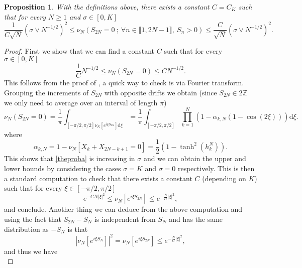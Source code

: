 \documentclass[reqno,11pt]{amsart}
\numberwithin{equation}{section}
\newcommand{\bbZ}{{\ensuremath{\mathbb Z}} }
\newcommand{\lint}{\llbracket}
\newcommand{\rint}{\rrbracket}
\newtheorem{proposition}[theorem]{Proposition}
\newcommand{\dd}{\mathrm{d}}
\begin{document}
\begin{proposition}\label{th:lemnun}
 With the definitions above, there exists a constant $C=C_K$ such that for every $N\ge 1$ and $\sigma\in[0,K]$
 \begin{equation}\label{compar}
 \frac{1}{C\sqrt{N}}(\sigma\vee N^{-1/2})^2 \le \nu_{N}\left( S_{2N}=0 \ ; \ \forall n\in \lint 1,2N-1\rint, \ S_{n}>0  \right)\le \frac{C}{\sqrt{N}}(\sigma\vee N^{-1/2})^2 .
 \end{equation}

\end{proposition}



\begin{proof}
 First we show that we can find a constant $C$ such that for every $\sigma\in[0,K]$
 \begin{equation}\label{zigma}
 \frac{1}{C} N^{-1/2} \le \nu_N(S_{2N}=0)\le C N^{-1/2}.
 \end{equation}
 This follows from  the proof of \cite[Lemma 11]{LabbeWABridge}, a quick way to check is via Fourier transform.
Grouping the increments of $S_{2N}$ with opposite drifts we obtain (since $S_{2N}\in 2\bbZ$ we only need to average over an interval of length $\pi$)
 \begin{equation}\label{theproba}
  \nu_N(S_{2N}=0)=  \frac{1}{\pi}\int_{[-\pi/2,\pi/2] \nu_N[e^{i\xi S_{2N}}]\dd \xi }
  =  \frac{1}{\pi} \int_{[-\pi/2,\pi/2]} \prod_{k=1}^{N} \left(1-\alpha_{k,N}(1-\cos (2\xi))    \right) \dd \xi.
 \end{equation}
where  $$\alpha_{k,N}=1-\nu_N[X_k+X_{2N-k+1}=0]=\frac{1}{2}\left(1-  \tanh^2 (h^N_k)\right)
.$$
This shows that \eqref{theproba} is increasing in $\sigma$ and we can obtain the upper and lower bounds by considering the cases $\sigma=K$ and $\sigma=0$ respectively. This is then a standard computation  to check that there exists a constant $C$ (depending on $K$) such that for every $\xi \in [-\pi/2,\pi/2]$
\begin{equation}
  e^{- CN|\xi|^2 }\le   \nu_N [e^{i\xi S_{2N}}] \le  e^{- \frac{N}{C}|\xi|^2 },
\end{equation}
and conclude.
Another thing we can deduce from the above computation 
and using the fact that $S_{2N}-S_N$ is independent from $S_N$ and has the same distribution as $-S_N$ is that 
\begin{equation}
 | { \nu_N}[e^{i\xi S_{N}}]|^2= \nu_N[e^{i\xi S_{2N}}] \le  e^{- \frac{N}{C}|\xi|^2 },
\end{equation}
and thus we have 
\begin{equation}\label{unifbound}

\end{equation}
\end{proof}
\end{document}
